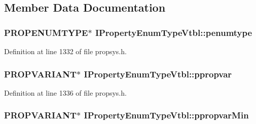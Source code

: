\subsection{Member Data Documentation}
\subsubsection[{\texorpdfstring{penumtype}{penumtype}}]{ {\bf P\+R\+O\+P\+E\+N\+U\+M\+T\+Y\+PE}$\ast$ I\+Property\+Enum\+Type\+Vtbl\+::penumtype}\hypertarget{struct_i_property_enum_type_vtbl_aa384d319cc3cd7e86ea94f577729d372}{}\label{struct_i_property_enum_type_vtbl_aa384d319cc3cd7e86ea94f577729d372}


Definition at line 1332 of file propsys.\+h.

\subsubsection[{\texorpdfstring{ppropvar}{ppropvar}}]{ {\bf P\+R\+O\+P\+V\+A\+R\+I\+A\+NT}$\ast$ I\+Property\+Enum\+Type\+Vtbl\+::ppropvar}\hypertarget{struct_i_property_enum_type_vtbl_acb672c8ea9c6ca5e144c88a235ea2e0a}{}\label{struct_i_property_enum_type_vtbl_acb672c8ea9c6ca5e144c88a235ea2e0a}


Definition at line 1336 of file propsys.\+h.

\subsubsection[{\texorpdfstring{ppropvar\+Min}{ppropvarMin}}]{ {\bf P\+R\+O\+P\+V\+A\+R\+I\+A\+NT}$\ast$ I\+Property\+Enum\+Type\+Vtbl\+::ppropvar\+Min}\hypertarget{struct_i_property_enum_type_vtbl_aa466b252bb93f229a693ec30fa42f89c}{}\label{struct_i_property_enum_type_vtbl_aa466b252bb93f229a693ec30fa42f89c}


